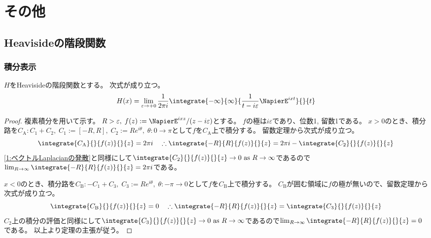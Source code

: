 \part{その他}
    \chapter{Heavisideの階段関数}
        \section{積分表示}
            \begin{shadebox}
                $H$をHeavisideの階段関数とする。
                次式が成り立つ。
                \[ H(x) = \lim_{\varepsilon\to +0}\frac{1}{2\pi i}\integrate{-\infty}{\infty}{\frac{1}{t-i\varepsilon}\NapierE^{ixt}}{}{t} \]
            \end{shadebox}
            \begin{proof}
                \quad\par
                複素積分を用いて示す。
                $R>\varepsilon,\;f(z) := \NapierE^{ixz}/(z-i\varepsilon)$とする。
                $f$の極は$i\varepsilon$であり、位数1, 留数1である。
                $x>0$のとき、積分路を$C_\mathrm{A}: C_1 + C_2,\; C_1 := [-R,R],\; C_2 := Re^{i\theta},\;\theta:0\to\pi$として$f$を$C_\mathrm{A}$上で積分する。
                留数定理から次式が成り立つ。
                \[ \integrate{C_\mathrm{A}}{}{f(z)}{}{z} = 2\pi i \quad \therefore \integrate{-R}{R}{f(z)}{}{z} = 2\pi i - \integrate{C_2}{}{f(z)}{}{z} \]
                \cite{数学備忘録}\ref{1:ベクトルLaplacianの発散}と同様にして$\integrate{C_2}{}{f(z)}{}{z} \to 0 \text{ as }R\to\infty$であるので$\lim_{R\to\infty}\integrate{-R}{R}{f(z)}{}{z} = 2\pi i$である。
                \par
                $x<0$のとき、積分路を$C_\mathrm{B}: -C_1 + C_3,\; C_3 := Re^{i\theta},\;\theta:-\pi\to 0$として$f$を$C_\mathrm{B}$上で積分する。
                $C_\mathrm{B}$が囲む領域に$f$の極が無いので、留数定理から次式が成り立つ。
                \[ \integrate{C_\mathrm{B}}{}{f(z)}{}{z} = 0 \quad \therefore \integrate{-R}{R}{f(z)}{}{z} = \integrate{C_3}{}{f(z)}{}{z} \]
                $C_\mathrm{2}$上の積分の評価と同様にして$\integrate{C_3}{}{f(z)}{}{z} \to 0 \text{ as }R\to\infty$であるので$\lim_{R\to\infty}\integrate{-R}{R}{f(z)}{}{z} = 0$である。
                以上より定理の主張が従う。
            \end{proof}